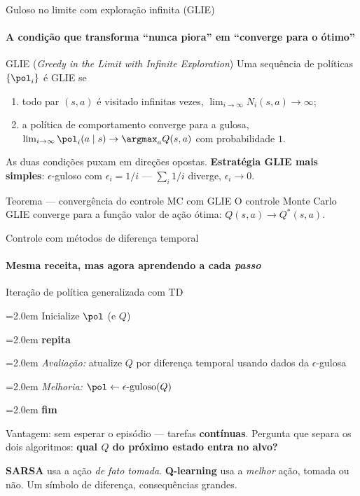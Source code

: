 \documentclass[aspectratio=169, 11pt]{beamer}
\newcommand{\Qstar}{Q^{*}}
\newcounter{plin}
\newcommand{\pl}[2][0em]{%
  \stepcounter{plin}%
  \par\noindent
  \hangindent=2.0em \hangafter=1
  \makebox[1.5em][r]{\color{rlCinza}\scriptsize\theplin:}\hspace{0.4em}\hspace*{#1}\ignorespaces#2\par}
\newenvironment{pseudo}%
  {\par\setcounter{plin}{0}\footnotesize\setlength{\parskip}{0.25ex}}%
  {\par}
\begin{document}
\begin{frame}{Guloso no limite com exploração infinita (GLIE)}
  \framesubtitle{A condição que transforma ``nunca piora'' em ``converge para o ótimo''}

  \begin{defbox}{GLIE (\emph{Greedy in the Limit with Infinite Exploration})}
    Uma sequência de políticas $\{\pol_i\}$ é GLIE se
    \begin{enumerate}\setlength{\itemsep}{0.3ex}
      \item todo par $(s,a)$ é visitado infinitas vezes,
        $\lim_{i \to \infty} N_i(s,a) \to \infty$;
      \item a política de comportamento converge para a gulosa,
        $\lim_{i \to \infty} \pol_i(a \mid s) \to \argmax_{a} Q(s,a)$ com
        probabilidade $1$.
    \end{enumerate}
  \end{defbox}

  {\small As duas condições puxam em direções opostas. \textbf{Estratégia
  GLIE mais simples}: $\epsilon$-guloso com $\epsilon_i = 1/i$ —
  $\sum_i 1/i$ diverge, $\epsilon_i \to 0$.}

  \begin{teobox}{Teorema — convergência do controle MC com GLIE}
    O controle Monte Carlo GLIE converge para a função valor de ação ótima:
    $Q(s,a) \to \Qstar(s,a)$.
  \end{teobox}
\end{frame}

\begin{frame}{Controle com métodos de diferença temporal}
  \framesubtitle{Mesma receita, mas agora aprendendo a cada \emph{passo}}

  \begin{algbox}{Iteração de política generalizada com TD}
    \begin{pseudo}
      \pl{Inicialize $\pol$ (e $Q$)}
      \pl{\textbf{repita}}
      \pl[1.2em]{\emph{Avaliação:} atualize $Q$ por diferença temporal usando dados da $\epsilon$-gulosa}
      \pl[1.2em]{\emph{Melhoria:} $\pol \leftarrow \epsilon\text{-guloso}(Q)$}
      \pl{\textbf{fim}}
    \end{pseudo}
  \end{algbox}

  {\small Vantagem: sem esperar o episódio — tarefas \textbf{contínuas}.
  Pergunta que separa os dois algoritmos: \textbf{qual $Q$ do próximo
  estado entra no alvo?}}

  \vspace{-0.4em}
  \begin{ideiabox}
    \textbf{SARSA} usa a ação \emph{de fato tomada}. \textbf{Q-learning}
    usa a \emph{melhor} ação, tomada ou não. Um símbolo de diferença,
    consequências grandes.
  \end{ideiabox}
\end{frame}
\end{document}
